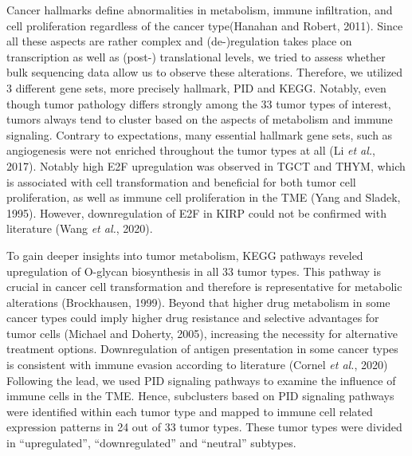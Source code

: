 \documentclass[
  parskip,
  oneside]{scrreprt}
\begin{document}
Cancer hallmarks define abnormalities in metabolism, immune
infiltration, and cell proliferation regardless of the cancer
type(Hanahan and Robert, 2011). Since all these aspects are rather
complex and (de-)regulation takes place on transcription as well as
(post-) translational levels, we tried to assess whether bulk sequencing
data allow us to observe these alterations. Therefore, we utilized 3
different gene sets, more precisely hallmark, PID and KEGG. Notably,
even though tumor pathology differs strongly among the 33 tumor types of
interest, tumors always tend to cluster based on the aspects of
metabolism and immune signaling. Contrary to expectations, many
essential hallmark gene sets, such as angiogenesis were not enriched
throughout the tumor types at all (Li \emph{et al.}, 2017). Notably high
E2F upregulation was observed in TGCT and THYM, which is associated with
cell transformation and beneficial for both tumor cell proliferation, as
well as immune cell proliferation in the TME (Yang and Sladek, 1995).
However, downregulation of E2F in KIRP could not be confirmed with
literature (Wang \emph{et al.}, 2020).

To gain deeper insights into tumor metabolism, KEGG pathways reveled
upregulation of O-glycan biosynthesis in all 33 tumor types. This
pathway is crucial in cancer cell transformation and therefore is
representative for metabolic alterations (Brockhausen, 1999). Beyond
that higher drug metabolism in some cancer types could imply higher drug
resistance and selective advantages for tumor cells (Michael and
Doherty, 2005), increasing the necessity for alternative treatment
options. Downregulation of antigen presentation in some cancer types is
consistent with immune evasion according to literature (Cornel \emph{et
al.}, 2020) Following the lead, we used PID signaling pathways to
examine the influence of immune cells in the TME. Hence, subclusters
based on PID signaling pathways were identified within each tumor type
and mapped to immune cell related expression patterns in 24 out of 33
tumor types. These tumor types were divided in ``upregulated'',
``downregulated'' and ``neutral'' subtypes.
\end{document}
